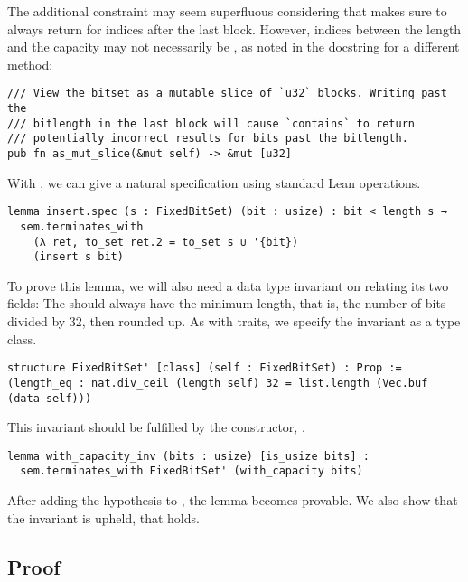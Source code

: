The additional constraint  may seem superfluous considering
that  makes sure to always return  for indices after
the last  block. However, indices between the length and the capacity
may not necessarily be , as noted in the docstring for a different method:

\begin{verbatim}
/// View the bitset as a mutable slice of `u32` blocks. Writing past the
/// bitlength in the last block will cause `contains` to return
/// potentially incorrect results for bits past the bitlength.
pub fn as_mut_slice(&mut self) -> &mut [u32]
\end{verbatim}

With , we can give  a natural specification using
standard Lean  operations.

\begin{verbatim}
lemma insert.spec (s : FixedBitSet) (bit : usize) : bit < length s →
  sem.terminates_with
    (λ ret, to_set ret.2 = to_set s ∪ '{bit})
    (insert s bit)
\end{verbatim}

To prove this lemma, we will also need a data type invariant on  relating its two
fields: The  should always have the minimum length, that is, the
number of bits divided by 32, then rounded up. As with traits, we specify the
invariant as a type class.

\begin{verbatim}
structure FixedBitSet' [class] (self : FixedBitSet) : Prop :=
(length_eq : nat.div_ceil (length self) 32 = list.length (Vec.buf (data self)))
\end{verbatim}

This invariant should be fulfilled by the constructor, .

\begin{verbatim}
lemma with_capacity_inv (bits : usize) [is_usize bits] :
  sem.terminates_with FixedBitSet' (with_capacity bits)
\end{verbatim}

After adding the hypothesis \lean{[FixedBitSet' s]} to , the
lemma becomes provable. We also show that the invariant is upheld, \ie that
 holds.

\subsection{Proof}

